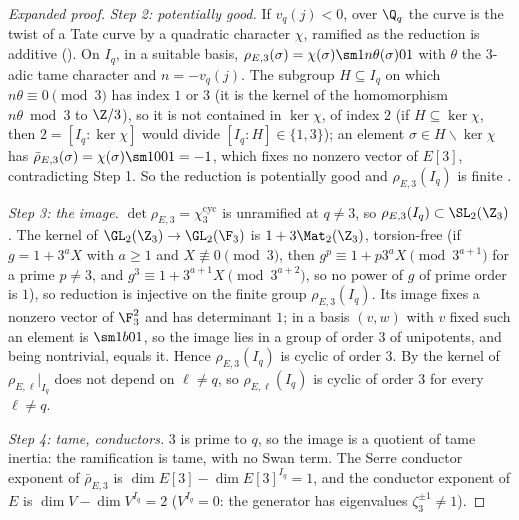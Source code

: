 \begin{sloppypar}
\begin{proof}[Expanded proof]
\emph{Step 2: potentially good.} If $v_q(j)<0$, over $\Q_q$ the curve is the twist of a Tate curve by a quadratic character $\chi$, ramified as the reduction is additive
(). On $I_q$, in a suitable basis, $\rho_{E,3}(\sigma)=\chi(\sigma)\sm1{n\theta(\sigma)}01$ with $\theta$ the $3$-adic tame character and $n=-v_q(j)$. The subgroup $H\subseteq I_q$
on which $n\theta\equiv0\pmod3$ has index $1$ or $3$ (it is the kernel of the homomorphism $n\theta\bmod3$ to $\Z/3$), so it is not contained in $\ker\chi$, of index $2$ (if $H\subseteq\ker\chi$,
then $2=[I_q:\ker\chi]$ would divide $[I_q:H]\in\{1,3\}$); an element $\sigma\in H\smallsetminus\ker\chi$ has $\bar\rho_{E,3}(\sigma)=\chi(\sigma)\sm1001=-1$, which fixes no nonzero vector of $E[3]$, contradicting
Step 1. So the reduction is potentially good and $\rho_{E,3}(I_q)$ is finite \cite[Section 2]{SerreTate68}.

\emph{Step 3: the image.} $\det\rho_{E,3}=\chi_3^{\mathrm{cyc}}$ is unramified at $q\ne3$, so $\rho_{E,3}(I_q)\subset\SL_2(\Z_3)$. The kernel of $\GL_2(\Z_3)\to\GL_2(\F_3)$ is $1+3\Mat_2(\Z_3)$,
torsion-free (if $g=1+3^aX$ with $a\ge1$ and $X\not\equiv0\pmod3$, then $g^p\equiv1+p3^aX\pmod{3^{a+1}}$ for a prime $p\ne3$, and $g^3\equiv1+3^{a+1}X\pmod{3^{a+2}}$, so
no power of $g$ of prime order is $1$), so reduction is injective on the finite group $\rho_{E,3}(I_q)$. Its image fixes a nonzero vector of $\F_3^2$ and has determinant $1$; in a basis
$(v,w)$ with $v$ fixed such an element is $\sm1b01$, so the image lies in a group of order $3$ of unipotents, and being nontrivial, equals it. Hence $\rho_{E,3}(I_q)$ is cyclic of
order $3$. By \cite[Section 2]{SerreTate68} the kernel of $\rho_{E,\ell}|_{I_q}$ does not depend on $\ell\ne q$, so $\rho_{E,\ell}(I_q)$ is cyclic of order $3$ for every $\ell\ne q$.

\emph{Step 4: tame, conductors.} $3$ is prime to $q$, so the image is a quotient of tame inertia: the ramification is tame, with no Swan term. The Serre conductor exponent
of $\bar\rho_{E,3}$ is $\dim E[3]-\dim E[3]^{I_q}=1$, and the conductor exponent of $E$ is $\dim V-\dim V^{I_q}=2$ ($V^{I_q}=0$: the generator has eigenvalues
$\zeta_3^{\pm1}\ne1$).


\end{proof}
\end{sloppypar}
